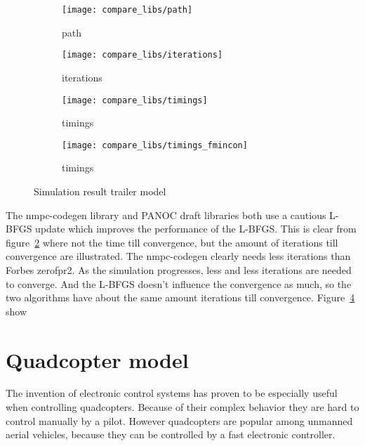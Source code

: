 \begin{figure}[H]
	\centering
	\begin{subfigure}[b]{0.45\textwidth}
		\centering
		\texttt{[image: compare\_libs/path]}
		\caption{path}
		\label{fig:solution path trailer example}
	\end{subfigure}
	\hfill
	\begin{subfigure}[b]{0.45\textwidth}
		\centering
		\texttt{[image: compare\_libs/iterations]}
		\caption{iterations}
		\label{fig:iterations trailer example}
	\end{subfigure}
	
	\begin{subfigure}[b]{0.45\textwidth}
		\centering
		\texttt{[image: compare\_libs/timings]}
		\caption{timings}
		\label{fig:timings trailer example}
	\end{subfigure}
	\hfill
	\begin{subfigure}[b]{0.45\textwidth}
		\centering
		\texttt{[image: compare\_libs/timings\_fmincon]}
		\caption{timings}
		\label{fig:timings fmincon Matlab trailer example}
	\end{subfigure}
	\caption{Simulation result trailer model}
	\label{fig:simulation result trailer model}
\end{figure}

The nmpc-codegen library and PANOC draft libraries both use a cautious L-BFGS update which improves the performance of the L-BFGS. This is clear from figure~\ref{fig:iterations trailer example} where not the time till convergence, but the amount of iterations till convergence are illustrated. The nmpc-codegen clearly needs less iterations than  Forbes zerofpr2. As the simulation progresses, less and less iterations are needed to converge. And the L-BFGS doesn't influence the convergence as much, so the two algorithms have about the same amount iterations till convergence. Figure~\ref{fig:timings fmincon Matlab trailer example} show


\section{Quadcopter model}
The invention of electronic control systems has proven to be especially useful when controlling quadcopters. Because of their complex behavior they are hard to control manually by a pilot. However quadcopters are popular among unmanned aerial vehicles, because they can be controlled by a fast electronic controller.

